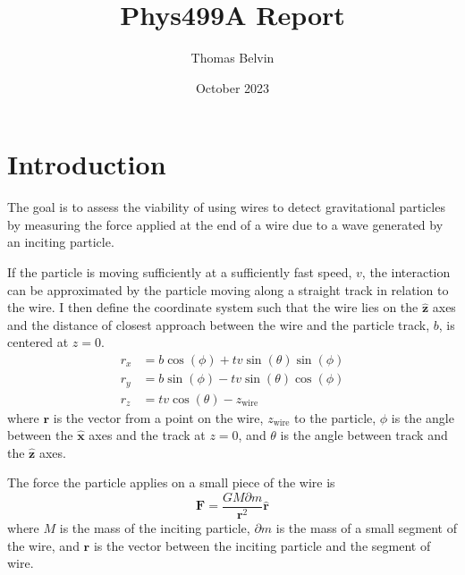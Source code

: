 \documentclass{report}
\title{Phys499A Report}
\author{Thomas Belvin}
\date{October 2023}
\begin{document}
\maketitle
\section{Introduction}
The goal is to assess the viability of using wires to detect gravitational particles 
by measuring the force applied at the end of a wire due to a wave generated by an inciting
particle.

If the particle is moving sufficiently at a sufficiently fast speed, $v$, the interaction can be approximated by the 
particle moving along a straight track in relation to the wire. I then define the coordinate system
such that the wire lies on the $\mathbf{\hat z}$ axes and the distance of closest approach between the 
wire and the particle track, $b$, is centered at $z = 0$. 
\begin{align}
    r_x &= b \cos (\phi )+t v \sin (\theta ) \sin (\phi )\\
    r_y &= b \sin (\phi )-t v \sin (\theta ) \cos (\phi )\\
    r_z &= t v \cos (\theta )-z_{\text{wire}}
\end{align}
where $\mathbf{r}$ is the vector from a point on the wire, $z_{\text{wire}}$ to the particle, $\phi$ is the angle between
the $\mathbf{\hat x}$ axes and the track at $z = 0$, and $\theta$ is the angle between track and the $\mathbf{\hat z}$ axes.

The force the particle applies on a small piece of the wire is
\begin{equation}
    \mathbf{F} = \frac{G M \partial m}{\mathbf{r}^2} \mathbf{\hat r}
\end{equation}
where $M$ is the mass of the inciting particle, $\partial m$ is the mass of a small segment of the wire,
and $\mathbf{r}$ is the vector between the inciting particle and the segment of wire.
\end{document}
